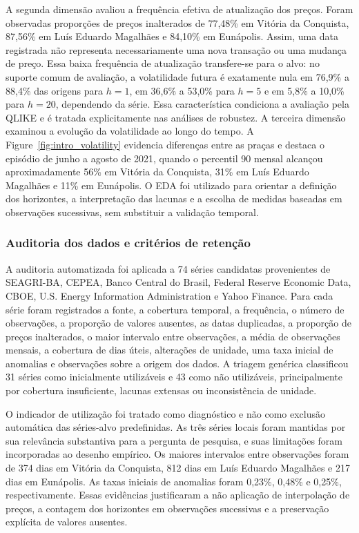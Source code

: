 \documentclass[a4paper,fleqn]{cas-sc}
\begin{document}
A segunda dimensão avaliou a frequência efetiva de atualização dos preços. Foram observadas proporções de preços inalterados de 77,48\% em Vitória da Conquista, 87,56\% em Luís Eduardo Magalhães e 84,10\% em Eunápolis. Assim, uma data registrada não representa necessariamente uma nova transação ou uma mudança de preço. Essa baixa frequência de atualização transfere-se para o alvo: no suporte comum de avaliação, a volatilidade futura é exatamente nula em 76,9\% a 88,4\% das origens para \(h=1\), em 36,6\% a 53,0\% para \(h=5\) e em 5,8\% a 10,0\% para \(h=20\), dependendo da série. Essa característica condiciona a avaliação pela QLIKE e é tratada explicitamente nas análises de robustez. A terceira dimensão examinou a evolução da volatilidade ao longo do tempo. A Figure~\ref{fig:intro_volatility} evidencia diferenças entre as praças e destaca o episódio de junho a agosto de 2021, quando o percentil 90 mensal alcançou aproximadamente 56\% em Vitória da Conquista, 31\% em Luís Eduardo Magalhães e 11\% em Eunápolis. O EDA foi utilizado para orientar a definição dos horizontes, a interpretação das lacunas e a escolha de medidas baseadas em observações sucessivas, sem substituir a validação temporal.

\subsubsection{Auditoria dos dados e critérios de retenção}
\label{subsec:data_audit}

A auditoria automatizada foi aplicada a 74 séries candidatas provenientes de SEAGRI-BA, CEPEA, Banco Central do Brasil, Federal Reserve Economic Data, CBOE, U.S. Energy Information Administration e Yahoo Finance. Para cada série foram registrados a fonte, a cobertura temporal, a frequência, o número de observações, a proporção de valores ausentes, as datas duplicadas, a proporção de preços inalterados, o maior intervalo entre observações, a média de observações mensais, a cobertura de dias úteis, alterações de unidade, uma taxa inicial de anomalias e observações sobre a origem dos dados. A triagem genérica classificou 31 séries como inicialmente utilizáveis e 43 como não utilizáveis, principalmente por cobertura insuficiente, lacunas extensas ou inconsistência de unidade.

O indicador de utilização foi tratado como diagnóstico e não como exclusão automática das séries-alvo predefinidas. As três séries locais foram mantidas por sua relevância substantiva para a pergunta de pesquisa, e suas limitações foram incorporadas ao desenho empírico. Os maiores intervalos entre observações foram de 374 dias em Vitória da Conquista, 812 dias em Luís Eduardo Magalhães e 217 dias em Eunápolis. As taxas iniciais de anomalias foram 0,23\%, 0,48\% e 0,25\%, respectivamente. Essas evidências justificaram a não aplicação de interpolação de preços, a contagem dos horizontes em observações sucessivas e a preservação explícita de valores ausentes.
\end{document}
